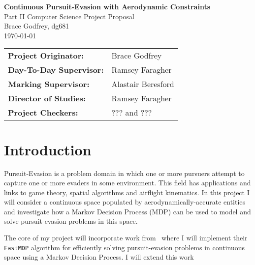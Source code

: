 \documentclass[12pt,a4paper,twoside]{article}
\begin{document}

\begin{titlepage} 

\vspace*{\fill}

\begin{center}
  \Huge
  \textbf{Continuous Pursuit-Evasion with Aerodynamic Constraints} \\[6mm]
  \Large
  Part II Computer Science Project Proposal \\[2mm]
  Brace Godfrey, dg681 \\[2mm]
  \today \\[8mm]
\end{center}

\vspace{150pt}

{\large
\begin{tabular}{ll}
  \bf Project Originator:  & Brace Godfrey          \\[4mm]
  \bf Day-To-Day Supervisor:  & Ramsey Faragher                \\[4mm]
  \bf Marking Supervisor: & Alastair Beresford                   \\[4mm]
  \bf Director of Studies: & Ramsey Faragher                   \\[4mm]
  \bf Project Checkers:           & ??? and ???
\end{tabular}
}

\vspace{170pt}

\end{titlepage}


\section{Introduction}

Pursuit-Evasion is a problem domain in which one or more pursuers attempt to capture one or more evaders in some environment. This field has applications and links to game theory, spatial algorithms and airflight kinematics. In this project I will consider a continuous space populated by aerodynamically-accurate entities and investigate how a Markov Decision Process (MDP) can be used to model and solve pursuit-evasion problems in this space.

The core of my project will incorporate work from~\cite{BertramWei2021} where I will implement their \texttt{FastMDP} algorithm for efficiently solving pursuit-evasion problems in continuous space using a Markov Decision Process. I will extend this work
\end{document}
